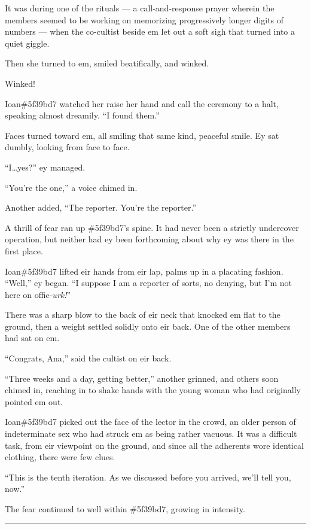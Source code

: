 It was during one of the rituals --- a call-and-response prayer wherein the members seemed to be working on memorizing progressively longer digits of numbers --- when the co-cultist beside em let out a soft sigh that turned into a quiet giggle.

Then she turned to em, smiled beatifically, and winked.

Winked!

Ioan\#5f39bd7 watched her raise her hand and call the ceremony to a halt, speaking almost dreamily. ``I found them.''

Faces turned toward em, all smiling that same kind, peaceful smile. Ey sat dumbly, looking from face to face.

``I\ldots{}yes?'' ey managed.

``You're the one,'' a voice chimed in.

Another added, ``The reporter. You're the reporter.''

A thrill of fear ran up \#5f39bd7's spine. It had never been a strictly undercover operation, but neither had ey been forthcoming about why ey was there in the first place.

Ioan\#5f39bd7 lifted eir hands from eir lap, palms up in a placating fashion. ``Well,'' ey began. ``I suppose I am a reporter of sorts, no denying, but I'm not here on offic-\emph{urk!}''

There was a sharp blow to the back of eir neck that knocked em flat to the ground, then a weight settled solidly onto eir back. One of the other members had sat on em.

``Congrats, Ana,'' said the cultist on eir back.

``Three weeks and a day, getting better,'' another grinned, and others soon chimed in, reaching in to shake hands with the young woman who had originally pointed em out.

Ioan\#5f39bd7 picked out the face of the lector in the crowd, an older person of indeterminate sex who had struck em as being rather vacuous. It was a difficult task, from eir viewpoint on the ground, and since all the adherents wore identical clothing, there were few clues.

``This is the tenth iteration. As we discussed before you arrived, we'll tell you, now.''

The fear continued to well within \#5f39bd7, growing in intensity.

\begin{center}\rule{0.5\linewidth}{0.5pt}\end{center}

